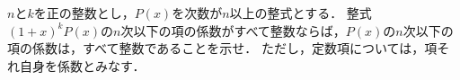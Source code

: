 \documentclass[../../main.tex]{subfiles}
\begin{document}
$n$と$k$を正の整数とし，$P(x)$を次数が$n$以上の整式とする．
整式$(1+x)^kP(x)$の$n$次以下の項の係数がすべて整数ならば，$P(x)$の$n$次以下の項の係数は，すべて整数であることを示せ．
ただし，定数項については，項それ自身を係数とみなす．
\end{document}
